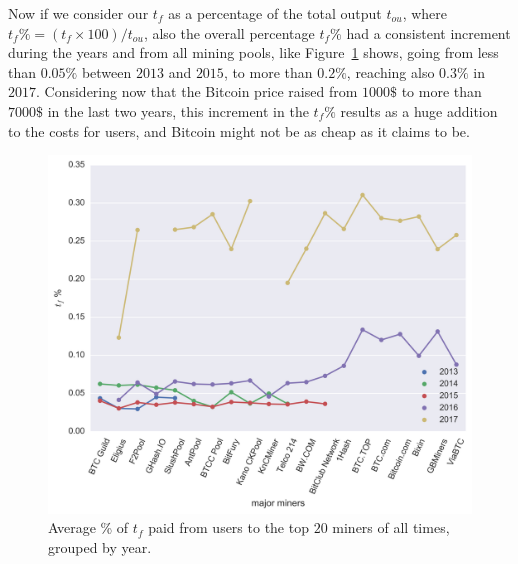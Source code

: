 \documentclass[USenglish]{uit-thesis}
\begin{document}
Now if we consider our $t_f$ as a percentage of the
total output $t_{ou}$, where $t_f\% = (t_f \times 100)/t_{ou}$,
also the overall percentage $t_f\%$ had a consistent
increment during the years and from all mining pools,
like Figure~\ref{fig:fee_input_miners} shows, going from
less than $0.05\%$ between $2013$ and $2015$, to
more than $0.2\%$, reaching also $0.3\%$ in $2017$.
Considering now that the Bitcoin price raised from
$1000\$$ to more than $7000\$$ in the last two years,
this increment in the $t_f\%$ results as a huge addition
to the costs for users, and Bitcoin might not be as cheap
as it claims to be.
\begin{figure}[h]
	\centering
	\includegraphics[width=1\textwidth]{img/fee_input_miners}
	\caption{Average \% of $t_f$ paid from users to the top $20$ miners of all times, grouped by year.}
	\label{fig:fee_input_miners}
\end{figure}

\end{document}
